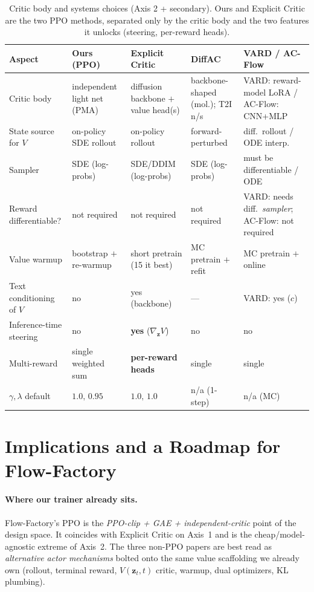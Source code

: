 \documentclass[11pt]{article}
\theoremstyle{remark}
\newcommand{\zt}{\bm{z}}
\begin{document}
\begin{table}[h]
\centering
\footnotesize
\setlength{\tabcolsep}{4pt}
\begin{tabular}{p{2.5cm} p{2.5cm} p{2.5cm} p{2.5cm} p{2.5cm}}
\toprule
\textbf{Aspect} & \textbf{Ours (PPO)} & \textbf{Explicit Critic} & \textbf{DiffAC} & \textbf{VARD / AC-Flow} \\
\midrule
Critic body & independent light net (PMA) & diffusion backbone $+$ value head(s) & backbone-shaped (mol.); T2I n/s & VARD: reward-model LoRA / AC-Flow: CNN+MLP \\
State source for $V$ & on-policy SDE rollout & on-policy rollout & forward-perturbed & diff.\ rollout / ODE interp. \\
Sampler & SDE (log-probs) & SDE/DDIM (log-probs) & SDE (log-probs) & must be differentiable / ODE \\
Reward differentiable? & not required & not required & not required & VARD: needs diff.\ \emph{sampler}; AC-Flow: not required \\
Value warmup & bootstrap $+$ re-warmup & short pretrain (15 it best) & MC pretrain $+$ refit & MC pretrain $+$ online \\
Text conditioning of $V$ & no & yes (backbone) & --- & VARD: yes ($c$) \\
Inference-time steering & no & \textbf{yes} ($\nabla_{\zt}V$) & no & no \\
Multi-reward & single weighted sum & \textbf{per-reward heads} & single & single \\
$\gamma,\lambda$ default & $1.0,\,0.95$ & $1.0,\,1.0$ & n/a (1-step) & n/a (MC) \\
\bottomrule
\end{tabular}
\caption{Critic body and systems choices (Axis 2 + secondary). Ours and Explicit Critic
are the two PPO methods, separated only by the critic body and the two features it
unlocks (steering, per-reward heads).}
\label{tab:systems}
\end{table}

\section{Implications and a Roadmap for Flow-Factory}
\label{sec:roadmap}

\paragraph{Where our trainer already sits.}
Flow-Factory's PPO is the \emph{PPO-clip + GAE + independent-critic} point of the design
space. It coincides with Explicit Critic on Axis~1 and is the cheap/model-agnostic
extreme of Axis~2. The three non-PPO papers are best read as \emph{alternative actor
mechanisms} bolted onto the same value scaffolding we already own (rollout, terminal
reward, $V(\zt_t,t)$ critic, warmup, dual optimizers, KL plumbing).
\end{document}
